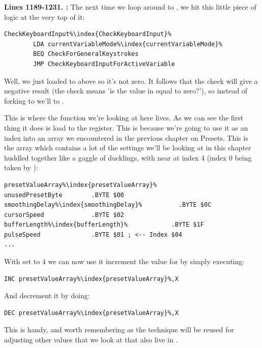 \textbf{Lines 1189-1231. :}  The next time we loop around
to , we hit this little piece of logic at the very top of it:

\begin{lstlisting}[escapechar=\%]
CheckKeyboardInput%\index{CheckKeyboardInput}%   
        LDA currentVariableMode%\index{currentVariableMode}%
        BEQ CheckForGeneralKeystrokes
        JMP CheckKeyboardInputForActiveVariable
\end{lstlisting}

Well, we just loaded  to  above so it's not zero.  It follows that
the  check will give a negative result (the check means 'is the value in  equal to zero?'), 
so instead of forking to  we'll  to .

This is where the function we're looking at here lives. As we can see the first thing it does is load 
 to the  register. This is because we're going to use it as an index
into an array we encountered in the previous chapter on Presets. This is the array 
which contains a lot of the settings we'll be looking at in this chapter huddled together like a gaggle
of ducklings, with  near at index 4 (index 0 being taken by ):

\begin{lstlisting}[escapechar=\%]
presetValueArray%\index{presetValueArray}%
unusedPresetByte        .BYTE $00
smoothingDelay%\index{smoothingDelay}%          .BYTE $0C
cursorSpeed             .BYTE $02
bufferLength%\index{bufferLength}%            .BYTE $1F
pulseSpeed              .BYTE $01 ; <-- Index $04
...
\end{lstlisting}

With  set to 4 we can now use it increment the value for  by
simply executing:
\begin{lstlisting}[escapechar=\%]
        INC presetValueArray%\index{presetValueArray}%,X
\end{lstlisting}
And decrement it by doing:
\begin{lstlisting}[escapechar=\%]
        DEC presetValueArray%\index{presetValueArray}%,X
\end{lstlisting}
This is handy, and worth remembering as the technique will be reused for adjusting other values that 
we look at that also live in .


